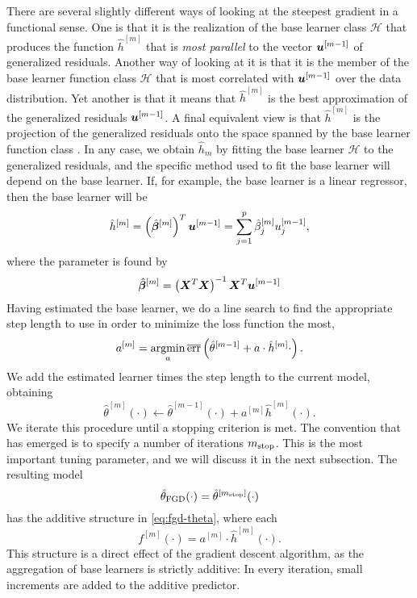 There are several slightly different ways of looking at the steepest gradient in a functional sense.
One is that it is the realization of the base learner class $\mathcal{H}$ that produces the function $\hat{h}^{[m]}$ that is \textit{most parallel} to the vector $\bm{u}^{[m-1]}$ of generalized residuals.
Another way of looking at it is that it is the member of the base learner function class $\mathcal{H}$ that is most correlated with $\bm{u}^{[m-1]}$ over the data distribution.
Yet another is that it means that $\hat{h}^{[m]}$ is the best approximation of the generalized residuals $\bm{u}^{[m-1]}$.
A final equivalent view is that $\hat{h}^{[m]}$ is the projection of the generalized residuals onto the space spanned by the base learner function class \citep{friedman2001}.
In any case, we obtain $\hat{h}_m$ by fitting the base learner $\mathcal{H}$ to the generalized residuals, and
the specific method used to fit the base learner will depend on the base learner.
If, for example, the base learner is a linear regressor, then the base learner will be
\begin{equation*}
    \hat{h}^{[m]}=\left(\hat{\boldsymbol{\beta}}^{[m]}\right)^T\bm{u}^{[m-1]}=\sum_{j=1}^p \hat{\beta}^{[m]}_j u_j^{[m-1]},
\end{equation*}
where the parameter is found by
\begin{equation*}
    \hat{\boldsymbol{\beta}}^{[m]}=\left(\bm{X} ^T \bm{X} \right)^{-1}\bm{X} ^T \bm{u}^{[m-1]}
\end{equation*}
Having estimated the base learner, we do a line search to find the appropriate step length to use in order to minimize the loss function the most,
\begin{equation*}
    a^{[m]}=\operatorname*{argmin}_{a}\overline{\text{err}}\left(\hat{\theta}^{[m-1]}+a\cdot\hat{h}^{[m]}{\cdot}\right).
\end{equation*}
We add the estimated learner times the step length to the current model, obtaining
\begin{equation*}
    \hat{\theta}^{[m]}(\cdot)\gets \hat{\theta}^{[m-1]}(\cdot)+a^{[m]}\hat{h}^{[m]}(\cdot).
\end{equation*}
We iterate this procedure until a stopping criterion is met.
The convention that has emerged is to specify a number of iterations $m_{\text{stop}}$.
This is the most important tuning parameter, and we will discuss it in the next subsection.
The resulting model
\begin{equation*}
    \hat{\theta}_{\text{FGD}}(\cdot)=\hat{\theta}^{[m_{\text{stop}}]}(\cdot)
\end{equation*}
has the additive structure in \ref{eq:fgd-theta}, where each
\begin{equation*}
    f^{[m]}(\cdot)=a^{[m]}\cdot \hat{h}^{[m]}(\cdot).
\end{equation*}
This structure is a direct effect of the gradient descent algorithm, as the aggregation of base learners is strictly additive:
In every iteration, small increments are added to the additive predictor.

